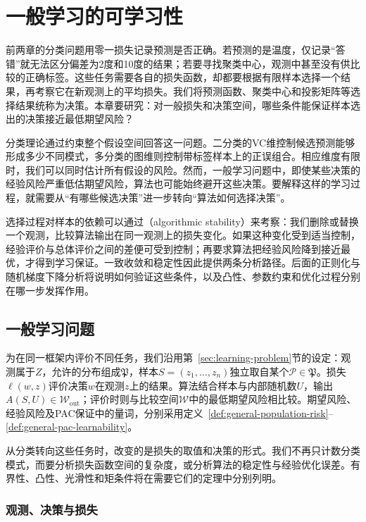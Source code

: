 \chapter{一般学习的可学习性}
\label{chap:convex-learning-and-stability}

前两章的分类问题用零一损失记录预测是否正确。若预测的是温度，仅记录“答错”就无法区分偏差为2度和10度的结果；若要寻找聚类中心，观测中甚至没有供比较的正确标签。这些任务需要各自的损失函数，却都要根据有限样本选择一个结果，再考察它在新观测上的平均损失。我们将预测函数、聚类中心和投影矩阵等选择结果统称为决策。本章要研究：对一般损失和决策空间，哪些条件能保证样本选出的决策接近最低期望风险？

分类理论通过约束整个假设空间回答这一问题。二分类的VC维控制候选预测能够形成多少不同模式，多分类的图维则控制带标签样本上的正误组合。相应维度有限时，我们可以同时估计所有假设的风险。然而，一般学习问题中，即使某些决策的经验风险严重低估期望风险，算法也可能始终避开这些决策。要解释这样的学习过程，就需要从“有哪些候选决策”进一步转向“算法如何选择决策”。

选择过程对样本的依赖可以通过（algorithmic stability）来考察：我们删除或替换一个观测，比较算法输出在同一观测上的损失变化。如果这种变化受到适当控制，经验评价与总体评价之间的差便可受到控制；再要求算法把经验风险降到接近最优，才得到学习保证。一致收敛和稳定性因此提供两条分析路径。后面的正则化与随机梯度下降分析将说明如何验证这些条件，以及凸性、参数约束和优化过程分别在哪一步发挥作用。

\section{一般学习问题}
\label{sec:general-learning-problem}

为在同一框架内评价不同任务，我们沿用第~\ref{sec:learning-problem}节的设定：观测属于$Z$，允许的分布组成$\mathfrak P$，样本$S=(z_1,\ldots,z_n)$独立取自某个$\mathcal P\in\mathfrak P$。损失$\ell(w,z)$评价决策$w$在观测$z$上的结果。算法结合样本与内部随机数$U$，输出$A(S,U)\in\mathcal W_{\mathrm{out}}$；评价时则与比较空间$\mathcal W$中的最低期望风险相比较。期望风险、经验风险及PAC保证中的量词，分别采用定义~\ref{def:general-population-risk}--\ref{def:general-pac-learnability}。

从分类转向这些任务时，改变的是损失的取值和决策的形式。我们不再只计数分类模式，而要分析损失函数空间的复杂度，或分析算法的稳定性与经验优化误差。有界性、凸性、光滑性和矩条件将在需要它们的定理中分别列明。

\subsection{观测、决策与损失}

